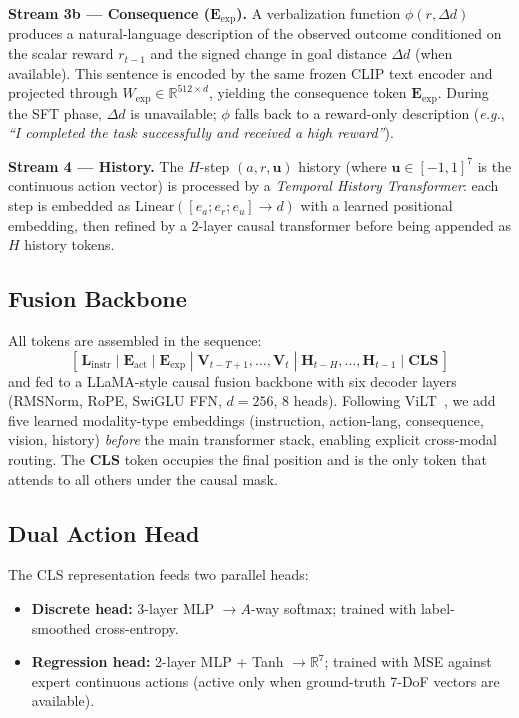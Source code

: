 \documentclass{article}
\newcommand{\eexp}{$\mathbf{E}_\text{exp}$}
\newcommand{\eg}{\textit{e.g.}}
\begin{document}
\vspace{2pt}\noindent\textbf{Stream 3b — Consequence (\eexp{}).}
A verbalization function $\phi(r, \Delta d)$ produces a natural-language description
of the observed outcome conditioned on the scalar reward $r_{t-1}$ and the
signed change in goal distance $\Delta d$ (when available).
This sentence is encoded by the same frozen CLIP text encoder and projected through
$W_\text{exp}\in\mathbb{R}^{512\times d}$, yielding the consequence token
$\mathbf{E}_\text{exp}$.
During the SFT phase, $\Delta d$ is unavailable; $\phi$ falls back to a
reward-only description
(\eg, \textit{``I completed the task successfully and received a high reward''}).

\vspace{2pt}\noindent\textbf{Stream 4 — History.}
The $H$-step $(a, r, \mathbf{u})$ history (where $\mathbf{u}\in[-1,1]^7$ is the
continuous action vector) is processed by a \emph{Temporal History Transformer}:
each step is embedded as $\text{Linear}([e_a; e_r; e_u] \to d)$ with a learned
positional embedding, then refined by a 2-layer causal transformer before being
appended as $H$ history tokens.

\subsection{Fusion Backbone}
All tokens are assembled in the sequence:
\[
  [\,\mathbf{L}_\text{instr}\;|\;\mathbf{E}_\text{act}\;|\;\mathbf{E}_\text{exp}\;|\;
  \mathbf{V}_{t-T+1},\ldots,\mathbf{V}_t\;|\;
  \mathbf{H}_{t-H},\ldots,\mathbf{H}_{t-1}\;|\;\mathbf{CLS}\,]
\]
and fed to a LLaMA-style causal fusion backbone with six decoder layers
(RMSNorm, RoPE, SwiGLU FFN, $d=256$, 8 heads).
Following ViLT~\citep{vilt}, we add five learned modality-type embeddings
(instruction, action-lang, consequence, vision, history)
\emph{before} the main transformer stack, enabling explicit cross-modal routing.
The $\mathbf{CLS}$ token occupies the final position and is the only token that
attends to all others under the causal mask.

\subsection{Dual Action Head}
The CLS representation feeds two parallel heads:
\begin{itemize}[nosep]
  \item \textbf{Discrete head:} 3-layer MLP $\to A$-way softmax; trained with
        label-smoothed cross-entropy.
  \item \textbf{Regression head:} 2-layer MLP + Tanh $\to \mathbb{R}^7$;
        trained with MSE against expert continuous actions
        (active only when ground-truth 7-DoF vectors are available).
\end{itemize}
\end{document}
